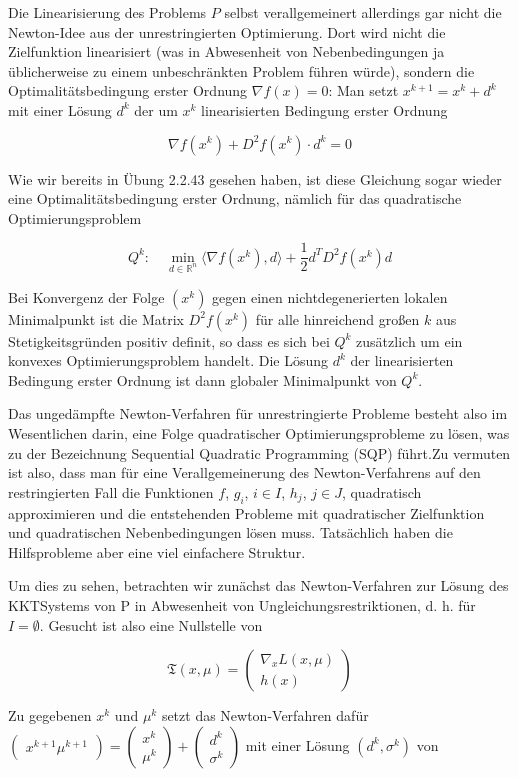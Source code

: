 \documentclass[11pt]{scrreprt}
\theoremstyle{thmstyle}
\numberwithin{thm}{section}
\begin{document}
Die Linearisierung des Problems $P$ selbst verallgemeinert allerdings gar nicht die Newton-Idee aus der unrestringierten Optimierung. Dort wird nicht die Zielfunktion linearisiert (was in Abwesenheit von Nebenbedingungen ja üblicherweise zu einem unbeschränkten Problem führen würde), sondern die Optimalitätsbedingung erster Ordnung $\nabla f(x) = 0$: Man setzt $x^{k+1} = x^k + d^k$ mit einer Lösung $d^k$ der um $x^k$ linearisierten Bedingung erster Ordnung

	$$ \nabla f(x^k) + D^2 f(x^k) \cdot d^k = 0 $$

Wie wir bereits in Übung 2.2.43 gesehen haben, ist diese Gleichung sogar wieder eine Optimalitätsbedingung erster Ordnung, nämlich für das quadratische Optimierungsproblem

	$$ Q^k : \quad \min_{d \in \mathbb{R}^n} \langle \nabla f(x^k), d \rangle + \frac{1}{2} d^T D^2 f(x^k) d $$
	
Bei Konvergenz der Folge $(x^k)$ gegen einen nichtdegenerierten lokalen Minimalpunkt ist die Matrix $D^2 f (x^k)$ für alle hinreichend großen $k$ aus Stetigkeitsgründen positiv definit, so dass es sich bei $Q^k$ zusätzlich um ein konvexes Optimierungsproblem handelt. Die Lösung $d^k$ der linearisierten Bedingung erster Ordnung ist dann globaler Minimalpunkt von $Q^k$. ~\bigskip

Das ungedämpfte Newton-Verfahren für unrestringierte Probleme besteht also im Wesentlichen darin, eine Folge quadratischer Optimierungsprobleme zu lösen, was zu der Bezeichnung Sequential Quadratic Programming (SQP) führt.Zu vermuten ist also, dass man für eine Verallgemeinerung des Newton-Verfahrens auf den restringierten Fall die Funktionen $f$, $g_i$, $i \in I$, $h_j$, $j \in J$, quadratisch approximieren und die entstehenden Probleme mit quadratischer Zielfunktion und quadratischen Nebenbedingungen lösen muss. Tatsächlich haben die Hilfsprobleme aber eine viel einfachere Struktur. ~\bigskip

Um dies zu sehen, betrachten wir zunächst das Newton-Verfahren zur Lösung des KKTSystems von P in Abwesenheit von Ungleichungsrestriktionen, d. h. für $I = \emptyset$. Gesucht ist also eine Nullstelle von

	$$ \mathfrak{T}(x, \mu) = \begin{pmatrix}
	\nabla_x L(x, \mu) \\ h(x) \end{pmatrix} $$
	
Zu gegebenen $x^k$ und $\mu^k$ setzt das Newton-Verfahren dafür $\begin{pmatrix} x^{k+1} \mu^{k+1} \end{pmatrix} = \begin{pmatrix} x^k \\ \mu^k \end{pmatrix} + \begin{pmatrix} d^k \\ \sigma^k \end{pmatrix}$ mit einer Lösung $(d^k, \sigma^k)$ von
\end{document}
